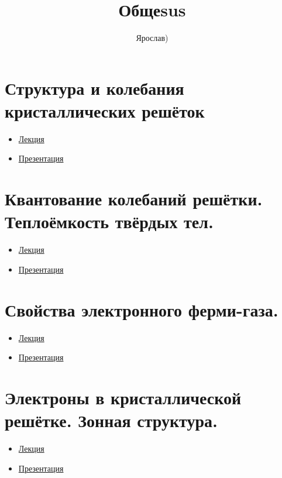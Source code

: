 \documentclass[a4paper]{article}
\author{Ярослав)}
\title{Общеsus}
\begin{document}
	\maketitle
\section{Структура и колебания кристаллических решёток}
\begin{multicols}{2}
\begin{itemize}
\item 
\href{run:./lec-text/01-structure-2020-feb03.pdf}{Лекция}
\item 
\href{run:./lec-pres/01-slides-2021.pdf}{Презентация}
\end{itemize}
\end{multicols}
\section{Квантование колебаний решётки. Теплоёмкость твёрдых тел.}
\begin{multicols}{2}
\begin{itemize}
\item 
\href{run:./lec-text/02-debye-2021-feb07.pdf}{Лекция}
\item 
\href{run:./lec-pres/02-slides-2021.pdf}{Презентация}
\end{itemize}
\end{multicols}
\section{Свойства электронного ферми-газа.}
\begin{multicols}{2}
\begin{itemize}
\item 
\href{run:./lec-text/03-fermi-2021-feb14.pdf}{Лекция}
\item 
\href{run:./lec-pres/03-slides-2021.pdf}{Презентация}
\end{itemize}
\end{multicols}
\section{Электроны в кристаллической решётке. Зонная структура.}
\begin{multicols}{2}
\begin{itemize}
\item 
\href{run:./lec-text/04-zones-2021-feb14.pdf}{Лекция}
\item 
\href{run:./lec-pres/04-slides-2021(video).pdf}{Презентация}
\end{itemize}
\end{multicols}
\end{document}
